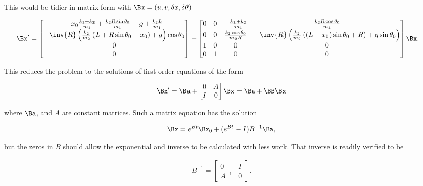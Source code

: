This would be tidier in matrix form with $\Bx = (u, v, \delta x, \delta \theta)$

\begin{align}
\label{eqn:hoopSpring:6}
\Bx' &=
\begin{bmatrix}
-x_0 \frac{k_1 + k_2}{m_1} 
+ \frac{k_2 R \sin\theta_0}{m_1} 
- g + \frac{k_2 L }{m_1} \\
- \inv{R}\left( \frac{k_2}{m_2} \left( L + R \sin\theta_0 - x_0 \right) +g \right) \cos\theta_0 \\
0 \\
0
\end{bmatrix}
+
\begin{bmatrix}
0 & 0 &
-\frac{k_1 + k_2}{m_1} & \frac{k_2 R \cos\theta_0}{m_1} \\
0 & 0 & 
\frac{k_2 \cos\theta_0}{m_2 R} &
- \inv{R}\left( \frac{k_2}{m_2} \left( \left( L - x_0 \right) \sin\theta_0 + R \right) + g \sin\theta_0 \right) \\
1 & 0 & 0 & 0 \\
0 & 1 & 0 & 0 \\
\end{bmatrix}\Bx
.
\end{align}

This reduces the problem to the solutions of first order equations of the form

\begin{align}\label{eqn:hoopSpring:7}
\Bx' = \Ba 
+ \begin{bmatrix}
0 & A \\
I & 0
\end{bmatrix}\Bx = \Ba + \BB \Bx
\end{align}

where $\Ba$, and $A$ are constant matrices.  Such a matrix equation has the solution

\begin{align}\label{eqn:hoopSpring:8}
\Bx = e^{B t} \Bx_0 + (e^{Bt} - I) B^{-1} \Ba,
\end{align}

but the zeros in $B$ should allow the exponential and inverse to be calculated with less work.  That inverse is readily verified to be

\begin{align}\label{eqn:hoopSpring:9}
B^{-1} =
\begin{bmatrix}
0 & I \\
A^{-1} & 0
\end{bmatrix}.
\end{align}


